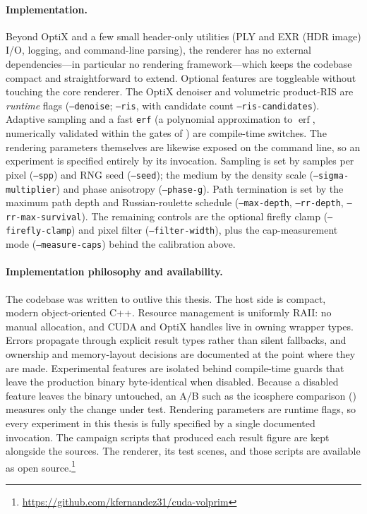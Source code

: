 \paragraph{Implementation.}{\sloppy Beyond OptiX and a few small header-only utilities (PLY and EXR (HDR image) I/O,
logging, and command-line parsing), the renderer has no external dependencies---in particular no
rendering framework---which keeps the codebase compact and straightforward to extend. Optional features are toggleable without touching the core renderer. The OptiX denoiser
and volumetric product-RIS are \emph{runtime} flags (\texttt{--denoise};
\texttt{--ris}, with candidate count \texttt{--ris-candidates}). Adaptive sampling and a fast \texttt{erf} (a polynomial approximation to $\operatorname{erf}$,
numerically validated within the gates of ) are compile-time
switches. The rendering parameters themselves are likewise exposed on the command line, so an experiment is
specified entirely by its invocation. Sampling is set by samples per pixel (\texttt{--spp}) and RNG seed
(\texttt{--seed}); the medium by the density scale (\texttt{--sigma-multiplier}) and phase anisotropy
(\texttt{--phase-g}). Path termination is set by the maximum path depth and Russian-roulette schedule
(\texttt{--max-depth}, \texttt{--rr-depth}, \texttt{--rr-max-survival}). The remaining controls are the optional firefly clamp (\texttt{--firefly-clamp}) and
pixel filter (\texttt{--filter-width}), plus the cap-measurement mode
(\texttt{--measure-caps}) behind the calibration above.\par}

\paragraph{Implementation philosophy and availability.} The codebase was written to outlive this
thesis. The host side is compact, modern object-oriented C++. Resource management is uniformly
RAII: no manual allocation, and CUDA and OptiX handles live in owning wrapper types. Errors propagate
through explicit result types rather than silent fallbacks, and ownership and memory-layout
decisions are documented at the point where they are made. Experimental features are isolated
behind compile-time guards that leave the production binary byte-identical when disabled.
Because a disabled feature leaves the binary untouched, an A/B such as the icosphere
comparison () measures only the change under test. Rendering parameters are runtime flags, so every experiment in this thesis is
fully specified by a single documented invocation. The campaign scripts that produced each
result figure are kept alongside the sources. The renderer, its test scenes, and those scripts are
available as open source.\footnote{\url{https://github.com/kfernandez31/cuda-volprim}}

